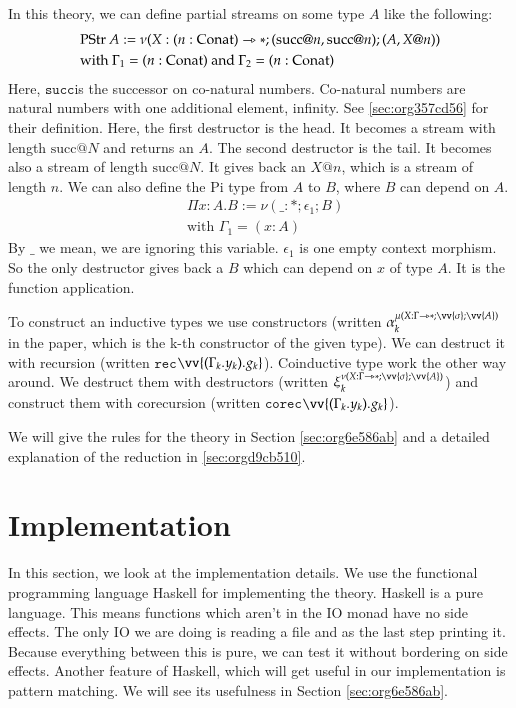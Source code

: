\documentclass[a4paper,cleardoubleempty,BCOR1cm]{scrbook}
\begin{document}
In this theory, we can define partial streams on some type \(A\) like the following:
\begin{align*}
&\text{PStr }A := \nu(X:(n:\text{Conat})\rightarrowtriangle*;(\text{succ} @ n, \text{succ} @ n);(A, X @ n))\\
&\text{with } \Gamma_1 = (n:\text{Conat}) \text{ and } \Gamma_2 = (n:\text{Conat})
\end{align*}
Here, $\mathtt{succ}$\;is the successor on co-natural numbers.  Co-natural numbers are
natural numbers with one additional element, infinity. See \ref{sec:org357cd56}
for their definition. Here, the first destructor is the head. It becomes a
stream with length \(\text{succ} @ N\) and returns an \(A\). The second destructor
is the tail. It becomes also a stream of length \(\text{succ} @ N\). It gives
back an \(X @ n\), which is a stream of length \(n\). We can also define the Pi
type from \(A\) to \(B\), where \(B\) can depend on \(A\).
\begin{align*}
&\Pi x:A.B := \nu(\_:*;\epsilon_1;B)\\
&\text{with } \Gamma_1 = (x:A)
\end{align*}
By \(\_\) we mean, we are ignoring this variable. \(\epsilon_1\) is one empty
context morphism.  So the only destructor gives back a \(B\) which can depend
on \(x\) of type \(A\).  It is the function application.

To construct an inductive types we use constructors (written
\(\alpha_k^{\mu(X:\Gamma\rat*;\vv{\sigma};\vv{A})}\) in the paper, which is the k-th
constructor of the given type).  We can destruct it with recursion (written
$\mathtt{rec}$\;\(\vv{(\Gamma_k.y_k).g_k}\)).  Coinductive type work the other way around.
We destruct them with destructors (written
\(\xi_k^{\nu(X:\Gamma\rat*;\vv{\sigma};\vv{A})}\)) and construct them with
corecursion (written $\mathtt{corec}$\;\(\vv{(\Gamma_k.y_k).g_k}\)).

We will give the rules for the theory in Section \ref{sec:org6e586ab} and a detailed
explanation of the reduction in \ref{sec:orgd9cb510}.

\chapter{Implementation}
\label{sec:org482ff9e}
In this section, we look at the implementation details.  We use the functional
programming language Haskell for implementing the theory. Haskell is a pure
language. This means functions which aren't in the IO monad have no side
effects. The only IO we are doing is reading a file and as the last step
printing it. Because everything between this is pure, we can test it without
bordering on side effects. Another feature of Haskell, which will get
useful in our implementation is pattern matching. We will see its usefulness
in Section \ref{sec:org6e586ab}.
\end{document}
